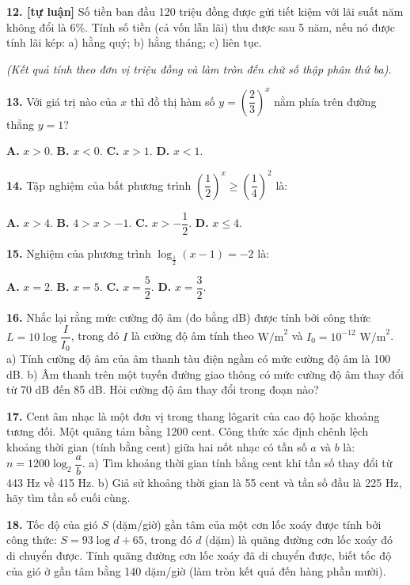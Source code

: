 \documentclass[12pt,a4paper]{extarticle}
\begin{document}
\noindent\textbf{12. [tự luận]} Số tiền ban đầu 120 triệu đồng được gửi tiết kiệm với lãi suất năm không đổi là 6\%. Tính số tiền (cả vốn lẫn lãi) thu được sau 5 năm, nếu nó được tính lãi kép:
\noindent a) hằng quý;
\noindent b) hằng tháng;
\noindent c) liên tục.
\vspace{0.15cm}

\noindent\textit{(Kết quả tính theo đơn vị triệu đồng và làm tròn đến chữ số thập phân thứ ba).}



\noindent\textbf{13.} Với giá trị nào của $x$ thì đồ thị hàm số $y = \left(\dfrac{2}{3}\right)^x$ nằm phía trên đường thẳng $y = 1$?
\vspace{0.2cm}

\noindent\textbf{A.} $x > 0$. \hfill \textbf{B.} $x < 0$. \hfill \textbf{C.} $x > 1$. \hfill \textbf{D.} $x < 1$.
\vspace{0.4cm}

\noindent\textbf{14.} Tập nghiệm của bất phương trình $\left(\dfrac{1}{2}\right)^x \ge \left(\dfrac{1}{4}\right)^2$ là:
\vspace{0.2cm}

\noindent\textbf{A.} $x > 4$. \hfill \textbf{B.} $4 > x > -1$. \hfill \textbf{C.} $x > -\dfrac{1}{2}$. \hfill \textbf{D.} $x \le 4$.
\vspace{0.4cm}

\noindent\textbf{15.} Nghiệm của phương trình $\log_{\frac{1}{2}}(x - 1) = -2$ là:
\vspace{0.2cm}

\noindent\textbf{A.} $x = 2$. \hfill \textbf{B.} $x = 5$. \hfill \textbf{C.} $x = \dfrac{5}{2}$. \hfill \textbf{D.} $x = \dfrac{3}{2}$.


\noindent\textbf{16.} Nhắc lại rằng mức cường độ âm (đo bằng dB) được tính bởi công thức $L = 10 \log \dfrac{I}{I_0}$, trong đó $I$ là cường độ âm tính theo $\text{W/m}^2$ và $I_0 = 10^{-12} \text{ W/m}^2$.
\noindent a) Tính cường độ âm của âm thanh tàu điện ngầm có mức cường độ âm là 100 dB.
\noindent b) Âm thanh trên một tuyến đường giao thông có mức cường độ âm thay đổi từ 70 dB đến 85 dB. Hỏi cường độ âm thay đổi trong đoạn nào?
\vspace{0.4cm}

\noindent\textbf{17.} Cent âm nhạc là một đơn vị trong thang lôgarit của cao độ hoặc khoảng tương đối. Một quãng tám bằng 1200 cent. Công thức xác định chênh lệch khoảng thời gian (tính bằng cent) giữa hai nốt nhạc có tần số $a$ và $b$ là: $n = 1200 \log_2 \dfrac{a}{b}$.
\noindent a) Tìm khoảng thời gian tính bằng cent khi tần số thay đổi từ 443 Hz về 415 Hz.
\noindent b) Giả sử khoảng thời gian là 55 cent và tần số đầu là 225 Hz, hãy tìm tần số cuối cùng.
\vspace{0.4cm}

\noindent\textbf{18.} Tốc độ của gió $S$ (dặm/giờ) gần tâm của một cơn lốc xoáy được tính bởi công thức: $S = 93 \log d + 65$, trong đó $d$ (dặm) là quãng đường cơn lốc xoáy đó di chuyển được. Tính quãng đường cơn lốc xoáy đã di chuyển được, biết tốc độ của gió ở gần tâm bằng 140 dặm/giờ (làm tròn kết quả đến hàng phần mười).
\end{document}
